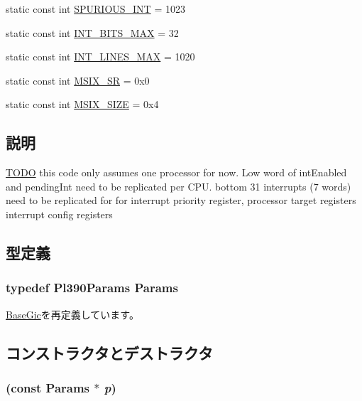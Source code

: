 \begin{DoxyCompactItemize}
\item 
static const int \hyperlink{classPl390_a5c2ca5d88991c1b1cd77340bf56fdaef}{SPURIOUS\_\-INT} = 1023
\item 
static const int \hyperlink{classPl390_ac0434966a31be307b3b2acd8975a169b}{INT\_\-BITS\_\-MAX} = 32
\item 
static const int \hyperlink{classPl390_a0158de396428c6145312576a210f1a59}{INT\_\-LINES\_\-MAX} = 1020
\item 
static const int \hyperlink{classPl390_a75f82acd63e66c4ab659e0889281e35b}{MSIX\_\-SR} = 0x0
\item 
static const int \hyperlink{classPl390_a6f1a976e6a4f72a669c64334981f2220}{MSIX\_\-SIZE} = 0x4
\end{DoxyCompactItemize}


\subsection{説明}
\begin{Desc}
\item[\hyperlink{todo__todo000054}{TODO}]this code only assumes one processor for now. Low word of intEnabled and pendingInt need to be replicated per CPU. bottom 31 interrupts (7 words) need to be replicated for for interrupt priority register, processor target registers interrupt config registers \end{Desc}


\subsection{型定義}
\hypertarget{classPl390_a1ac197c7f5e1a7b8d7178444a1474e45}{
\subsubsection[{Params}]{\setlength{\rightskip}{0pt plus 5cm}typedef Pl390Params {\bf Params}}}
\label{classPl390_a1ac197c7f5e1a7b8d7178444a1474e45}


\hyperlink{classBaseGic_aacf2140b95fc8c326a11f01521f5018d}{BaseGic}を再定義しています。

\subsection{コンストラクタとデストラクタ}
\hypertarget{classPl390_a0547d5a93535c7865012ca99652733c1}{
\subsubsection[{Pl390}]{ (const {\bf Params} $\ast$ {\em p})}}
\label{classPl390_a0547d5a93535c7865012ca99652733c1}



